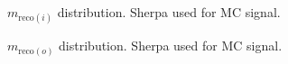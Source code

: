 \begin{figure}[h!tbp]
	\centering
	\hfill
	\caption{$m_{\text{reco}(i)}$ distribution. Sherpa used for MC signal.}
	\label{AFig3S}
\end{figure} 

\begin{figure}[h!tbp]
	\centering
	\hfill
	\caption{$m_{\text{reco}(o)}$ distribution. Sherpa used for MC signal.}
	\label{AFig4S}
\end{figure} 


